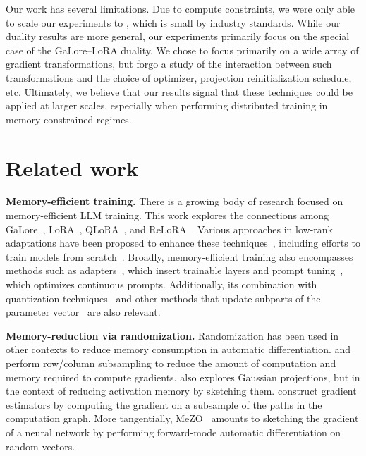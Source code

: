 Our work has several limitations. Due to  compute constraints, we were only able to scale our experiments to \largeB, which is small by industry standards. While our duality results are more general, our experiments primarily focus on the special case of the GaLore--LoRA duality.
We chose to focus primarily on a wide array of gradient transformations, but forgo a study of the interaction between such transformations and the choice of optimizer, projection reinitialization schedule, etc.
Ultimately, we believe that our results signal that these techniques could be applied at larger scales, especially when performing distributed training in memory-constrained regimes.

\vcram{-1mm}
\section{Related work}
\vcram{-1mm}
\noindent\textbf{Memory-efficient training.}
There is a growing body of research focused on memory-efficient LLM training. This work explores the connections among GaLore~\citep{galore}, LoRA~\citep{lora}, QLoRA~\citep{qlora}, and ReLoRA~\citep{relora}. Various approaches in low-rank adaptations have been proposed to enhance these techniques~\citep{renduchintala2023tied,sheng2023s,zhang2023lora,xia2024chain,wang2023multilora,hao2024flora,wang2024pmss}, including efforts to train models from scratch~\citep{kamalakara2022exploring,wang2023cuttlefish,zhao2023inrank}. Broadly, memory-efficient training also encompasses methods such as adapters~\citep{houlsby2019parameter,mahabadi2021parameter}, which insert trainable layers  and prompt tuning~\citep{li-liang-2021-prefix,lester-etal-2021-power}, which optimizes continuous prompts. Additionally, its combination with quantization techniques~\citep{kwon-etal-2022-alphatuning} and other methods that update subparts of the parameter vector~\citep{guo2021diff,zaken2021bitfit,NEURIPS2021_cb2653f5} are also relevant.


\noindent\textbf{Memory-reduction via randomization.}
Randomization has been used in other contexts to reduce memory consumption in automatic differentiation.
\citet{adelman} and \citet{wta-rcs} perform row/column subsampling to reduce the amount of computation and memory required to compute gradients.
\citet{bershatsky} also explores Gaussian projections, but in the context of reducing activation memory by sketching them.
\citet{randomized-ad} construct gradient estimators by computing the gradient on a subsample of the paths in the computation graph.
More tangentially, MeZO~\citep{mezo} amounts to sketching the gradient of a neural network by performing forward-mode automatic differentiation on random vectors.

